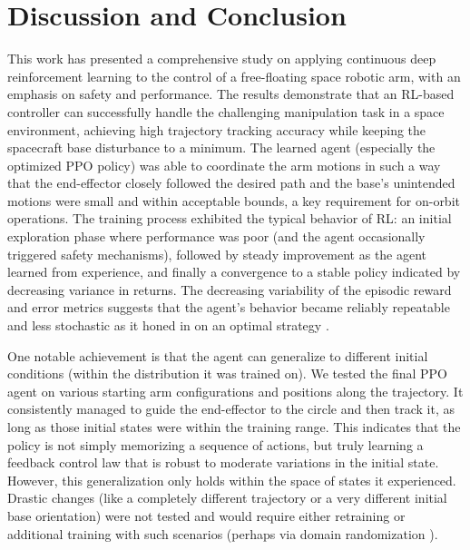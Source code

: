 \documentclass{ieeeaccess}
\begin{document}
\section{Discussion and Conclusion}
This work has presented a comprehensive study on applying continuous deep reinforcement learning
to the control of a free-floating space robotic arm, with an emphasis on safety and performance. The
results demonstrate that an RL-based controller can successfully handle the challenging
manipulation task in a space environment, achieving high trajectory tracking accuracy while keeping
the spacecraft base disturbance to a minimum. The learned agent (especially the optimized
PPO policy) was able to coordinate the arm motions in such a way that the end-effector closely followed
the desired path and the base’s unintended motions were small and within acceptable bounds, a key
requirement for on-orbit operations. The training process exhibited the typical behavior of RL: an
initial exploration phase where performance was poor (and the agent occasionally triggered safety
mechanisms), followed by steady improvement as the agent learned from experience, and finally a
convergence to a stable policy indicated by decreasing variance in returns. The decreasing
variability of the episodic reward and error metrics suggests that the agent’s behavior became reliably
repeatable and less stochastic as it honed in on an optimal strategy \cite{b1,b7}.

One notable achievement is that the agent can generalize to different initial conditions (within the
distribution it was trained on). We tested the final PPO agent on various starting arm configurations and
positions along the trajectory. It consistently managed to guide the end-effector to the circle and then
track it, as long as those initial states were within the training range. This indicates that the policy is
not simply memorizing a sequence of actions, but truly learning a feedback control law that is robust to
moderate variations in the initial state. However, this generalization only holds within the space of
states it experienced. Drastic changes (like a completely different trajectory or a very different initial
base orientation) were not tested and would require either retraining or additional training with such
scenarios (perhaps via domain randomization \cite{b8}).
\end{document}
